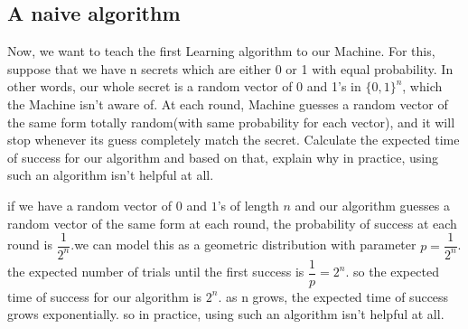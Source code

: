 \subsection{ A naive algorithm}
Now, we want to teach the first Learning algorithm to our Machine. For this, suppose that we
have n secrets which are either 0 or 1 with equal probability. In other words, our whole secret
is a random vector of 0 and 1’s in $\{0, 1\}^n$, which the Machine isn’t aware of. At each round,
Machine guesses a random vector of the same form totally random(with same probability for
each vector), and it will stop whenever its guess completely match the secret. Calculate the
expected time of success for our algorithm and based on that, explain why in practice, using
such an algorithm isn’t helpful at all.
\begin{qsolve}
	\begin{qsolve}[]
		if we have a random vector of $0$ and $1$'s of length $n$ and our algorithm guesses a random vector of the same form at each round, the probability of success at each round is $\dfrac{1}{2^n}$.we can model this as a geometric distribution with parameter $p = \dfrac{1}{2^n}$. the expected number of trials until the first success is $\dfrac{1}{p} = 2^n$. so the expected time of success for our algorithm is $2^n$. as n grows, the expected time of success grows exponentially. so in practice, using such an algorithm isn’t helpful at all.
	\end{qsolve}
\end{qsolve}
